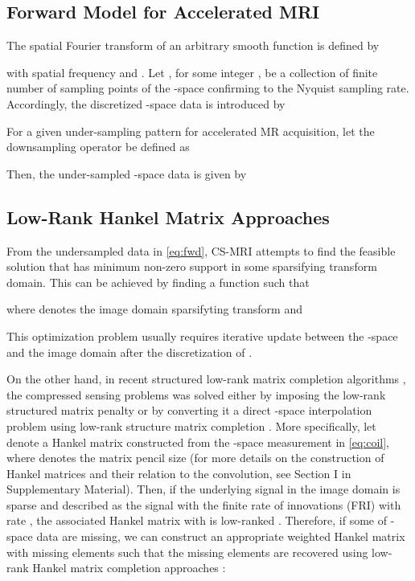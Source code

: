 \documentclass[10pt,journal]{IEEEtran}
\newcommand{\0}{{\boldsymbol{0}}}
\begin{document}
\subsection{Forward Model for Accelerated MRI}




The spatial Fourier transform of an arbitrary smooth function  is defined by 

with spatial frequency  and .
Let  , for some integer , be a collection of finite number of sampling points of the -space
 confirming to the Nyquist sampling rate. 
 Accordingly, the discretized -space data    is introduced by

For a given under-sampling pattern  for accelerated MR acquisition, let 
  the downsampling operator  
  be defined as
  
Then, the under-sampled  -space data is given by





\subsection{Low-Rank Hankel Matrix Approaches} \label{sec:theory}


From the undersampled data in \eqref{eq:fwd}, CS-MRI  \cite{lustig2007sparse,jung2009k} attempts to find the feasible solution  that has minimum non-zero support in some sparsifying
transform domain. This can be achieved
by finding a function  such that 

where  denotes the image domain sparsifyting transform
and 

This optimization problem usually requires  iterative update between the -space and the image domain after the discretization of    \cite{lustig2007sparse,jung2009k}.


On the other hand, in  recent structured low-rank  matrix completion algorithms  \cite{shin2014calibrationless,haldar2014low,jin2016general,ongie2016off,ye2016compressive},
the compressed sensing problems was solved either by imposing the low-rank structured matrix penalty \cite{haldar2014low,ongie2016off}
or by converting it a direct -space interpolation problem using low-rank structure matrix completion \cite{shin2014calibrationless,jin2016general}.
More specifically, let  denote a 
 Hankel matrix constructed from the -space measurement  in \eqref{eq:coil}, where  denotes the
 matrix pencil size (for more details on the construction of Hankel matrices and their relation to the convolution, see Section I in Supplementary Material).
Then,
 if the underlying signal  in the image domain is sparse and  described as the signal with the finite rate of innovations (FRI) with rate  \cite{vetterli2002sampling},
  the associated Hankel matrix  with  
 is low-ranked  \cite{ye2016compressive,jin2016general,ongie2016off}.
  Therefore, if some of -space data  are missing,
we can construct an appropriate weighted Hankel matrix with missing elements such that the missing elements are recovered 
using low-rank Hankel matrix completion approaches \cite{candes2009exact}:
\end{document}
